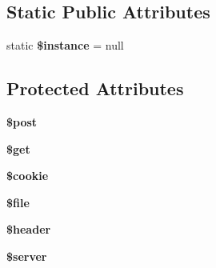 \subsection*{Static Public Attributes}
\begin{DoxyCompactItemize}
\item 
\hypertarget{class_anemo_1_1_application_1_1_http_1_1_request_ad9d7ce33ebb142b70e58b68052ca0ea8}{
static {\bfseries \$instance} = null}
\label{class_anemo_1_1_application_1_1_http_1_1_request_ad9d7ce33ebb142b70e58b68052ca0ea8}

\end{DoxyCompactItemize}
\subsection*{Protected Attributes}
\begin{DoxyCompactItemize}
\item 
\hypertarget{class_anemo_1_1_application_1_1_http_1_1_request_a53d6c7669d97392c407c4f959a5263db}{
{\bfseries \$post}}
\label{class_anemo_1_1_application_1_1_http_1_1_request_a53d6c7669d97392c407c4f959a5263db}

\item 
\hypertarget{class_anemo_1_1_application_1_1_http_1_1_request_a6dba07cf5cb37f05ef89d2b9afacf046}{
{\bfseries \$get}}
\label{class_anemo_1_1_application_1_1_http_1_1_request_a6dba07cf5cb37f05ef89d2b9afacf046}

\item 
\hypertarget{class_anemo_1_1_application_1_1_http_1_1_request_ab8deb5892402f43a0fde234f317f8e31}{
{\bfseries \$cookie}}
\label{class_anemo_1_1_application_1_1_http_1_1_request_ab8deb5892402f43a0fde234f317f8e31}

\item 
\hypertarget{class_anemo_1_1_application_1_1_http_1_1_request_aa1bfbd27060176201b271918dff57e8f}{
{\bfseries \$file}}
\label{class_anemo_1_1_application_1_1_http_1_1_request_aa1bfbd27060176201b271918dff57e8f}

\item 
\hypertarget{class_anemo_1_1_application_1_1_http_1_1_request_a4f44601f2b9dc8a1644bce53c94ce622}{
{\bfseries \$header}}
\label{class_anemo_1_1_application_1_1_http_1_1_request_a4f44601f2b9dc8a1644bce53c94ce622}

\item 
\hypertarget{class_anemo_1_1_application_1_1_http_1_1_request_ad135cc8a47e55f0829949cf62214170f}{
{\bfseries \$server}}
\label{class_anemo_1_1_application_1_1_http_1_1_request_ad135cc8a47e55f0829949cf62214170f}


\end{DoxyCompactItemize}
